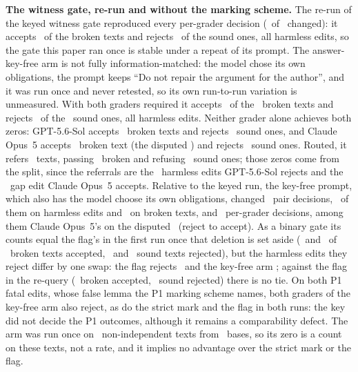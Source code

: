 \textbf{The witness gate, re-run and without the marking scheme.} The re-run of the keyed witness gate reproduced every per-grader decision (\CRKeyedRerunChanged\ of \CRNResponses\ changed): it accepts \CRKeyedRerunBrokenAcc\ of the broken texts and rejects \CRKeyedRerunSoundRej\ of the sound ones, all harmless edits, so the gate this paper ran once is stable under a repeat of its prompt. The answer-key-free arm is not fully information-matched: the model chose its own obligations, the prompt keeps ``Do not repair the argument for the author'', and it was run once and never retested, so its own run-to-run variation is unmeasured. With both graders required it accepts \CRKeyFreeBrokenAcc\ of the \CRNBroken\ broken texts and rejects \CRKeyFreeSoundRej\ of the \CRNSound\ sound ones, all harmless edits. Neither grader alone achieves both zeros: GPT-5.6-Sol accepts \CRKeyFreeGPTBrokenAcc\ broken texts and rejects \CRKeyFreeGPTSoundRej\ sound ones, and Claude Opus~5 accepts \CRKeyFreeClaudeBrokenAcc\ broken text (the disputed \CRIdGptPoneG) and rejects \CRKeyFreeClaudeSoundRej\ sound ones. Routed, it refers \CRKeyFreeRouteRef\ texts, passing \CRKeyFreeRouteBroken\ broken and refusing \CRKeyFreeRouteSound\ sound ones; those zeros come from the split, since the referrals are the \CRKeyFreeRouteRefH\ harmless edits GPT-5.6-Sol rejects and the \CRKeyFreeRouteRefG\ gap edit Claude Opus~5 accepts. Relative to the keyed run, the key-free prompt, which also has the model choose its own obligations, changed \CRKeyFreePairChanges\ pair decisions, \CRKeyFreePairChangesH\ of them on harmless edits and \CRKeyFreePairChangesBroken\ on broken texts, and \CRKeyFreeModelChanges\ per-grader decisions, among them Claude Opus~5's on the disputed \CRIdGptPoneG\ (reject to accept). As a binary gate its counts equal the flag's in the first run once that deletion is set aside (\CRKeyFreeBrokenAccExclOne\ and \CRFlagBrokenAccExclOneP\ of \CRNBrokenExclOne\ broken texts accepted, \CRKeyFreeSoundRej\ and \CRFlagSoundRejP\ sound texts rejected), but the harmless edits they reject differ by one swap: the flag rejects \CRIdKimiPoneH\ and the key-free arm \CRIdXhighH; against the flag in the re-query (\CRFlagBrokenAccR\ broken accepted, \CRFlagSoundRejR\ sound rejected) there is no tie. On both P1 fatal edits, whose false lemma the P1 marking scheme names, both graders of the key-free arm also reject, as do the strict mark and the flag in both runs: the key did not decide the P1 outcomes, although it remains a comparability defect. The arm was run once on \CRNTexts\ non-independent texts from \CRNBases\ bases, so its zero is a count on these texts, not a rate, and it implies no advantage over the strict mark or the flag.

